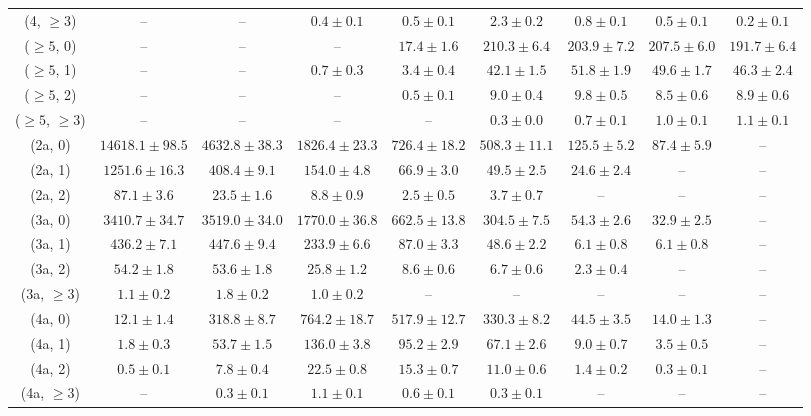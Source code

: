 \begin{table}[h!]
{\begin{tabular}{ccccccccc}
	(4, $\ge3$) & -- & -- & $0.4\pm 0.1$ & $0.5\pm 0.1$ & $2.3\pm 0.2$ & $0.8\pm 0.1$ & $0.5\pm 0.1$ & $0.2\pm 0.1$ \\[0.5ex] 
	($\ge5$, 0) & -- & -- & -- & $17.4\pm 1.6$ & $210.3\pm 6.4$ & $203.9\pm 7.2$ & $207.5\pm 6.0$ & $191.7\pm 6.4$ \\[0.5ex] 
	($\ge5$, 1) & -- & -- & $0.7\pm 0.3$ & $3.4\pm 0.4$ & $42.1\pm 1.5$ & $51.8\pm 1.9$ & $49.6\pm 1.7$ & $46.3\pm 2.4$ \\[0.5ex] 
	($\ge5$, 2) & -- & -- & -- & $0.5\pm 0.1$ & $9.0\pm 0.4$ & $9.8\pm 0.5$ & $8.5\pm 0.6$ & $8.9\pm 0.6$ \\[0.5ex] 
	($\ge5$, $\ge3$) & -- & -- & -- & -- & $0.3\pm 0.0$ & $0.7\pm 0.1$ & $1.0\pm 0.1$ & $1.1\pm 0.1$ \\[0.5ex] 
	(2a, 0) & $14618.1\pm 98.5$ & $4632.8\pm 38.3$ & $1826.4\pm 23.3$ & $726.4\pm 18.2$ & $508.3\pm 11.1$ & $125.5\pm 5.2$ & $87.4\pm 5.9$ & -- \\[0.5ex] 
	(2a, 1) & $1251.6\pm 16.3$ & $408.4\pm 9.1$ & $154.0\pm 4.8$ & $66.9\pm 3.0$ & $49.5\pm 2.5$ & $24.6\pm 2.4$ & -- & -- \\[0.5ex] 
	(2a, 2) & $87.1\pm 3.6$ & $23.5\pm 1.6$ & $8.8\pm 0.9$ & $2.5\pm 0.5$ & $3.7\pm 0.7$ & -- & -- & -- \\[0.5ex] 
	(3a, 0) & $3410.7\pm 34.7$ & $3519.0\pm 34.0$ & $1770.0\pm 36.8$ & $662.5\pm 13.8$ & $304.5\pm 7.5$ & $54.3\pm 2.6$ & $32.9\pm 2.5$ & -- \\[0.5ex] 
	(3a, 1) & $436.2\pm 7.1$ & $447.6\pm 9.4$ & $233.9\pm 6.6$ & $87.0\pm 3.3$ & $48.6\pm 2.2$ & $6.1\pm 0.8$ & $6.1\pm 0.8$ & -- \\[0.5ex] 
	(3a, 2) & $54.2\pm 1.8$ & $53.6\pm 1.8$ & $25.8\pm 1.2$ & $8.6\pm 0.6$ & $6.7\pm 0.6$ & $2.3\pm 0.4$ & -- & -- \\[0.5ex] 
	(3a, $\ge3$) & $1.1\pm 0.2$ & $1.8\pm 0.2$ & $1.0\pm 0.2$ & -- & -- & -- & -- & -- \\[0.5ex] 
	(4a, 0) & $12.1\pm 1.4$ & $318.8\pm 8.7$ & $764.2\pm 18.7$ & $517.9\pm 12.7$ & $330.3\pm 8.2$ & $44.5\pm 3.5$ & $14.0\pm 1.3$ & -- \\[0.5ex] 
	(4a, 1) & $1.8\pm 0.3$ & $53.7\pm 1.5$ & $136.0\pm 3.8$ & $95.2\pm 2.9$ & $67.1\pm 2.6$ & $9.0\pm 0.7$ & $3.5\pm 0.5$ & -- \\[0.5ex] 
	(4a, 2) & $0.5\pm 0.1$ & $7.8\pm 0.4$ & $22.5\pm 0.8$ & $15.3\pm 0.7$ & $11.0\pm 0.6$ & $1.4\pm 0.2$ & $0.3\pm 0.1$ & -- \\[0.5ex] 
	(4a, $\ge3$) & -- & $0.3\pm 0.1$ & $1.1\pm 0.1$ & $0.6\pm 0.1$ & $0.3\pm 0.1$ & -- & -- & -- \\[0.5ex] 

\end{tabular}}
\end{table}
